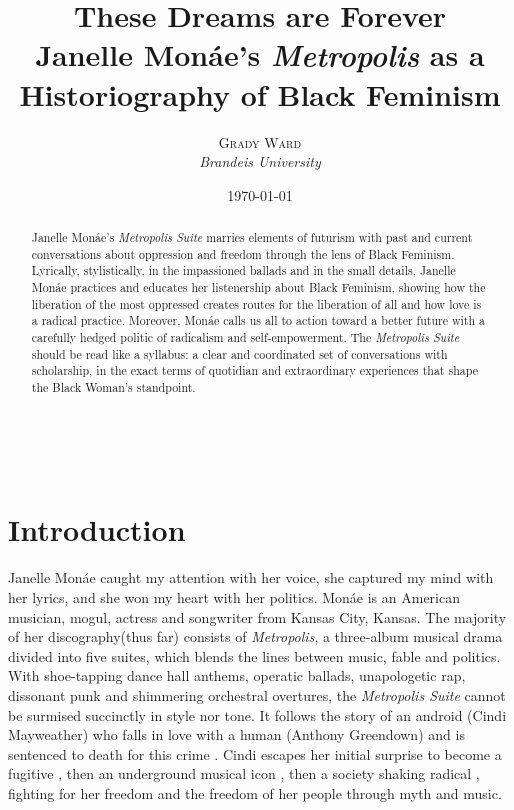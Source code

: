 \documentclass[a4paper, 11pt]{article} %
\title{\textbf{\linespread{2.1}These Dreams are Forever}\\ %
Janelle Mon\'ae's \emph{Metropolis} as a Historiography of Black Feminism} %
\author{\textsc{Grady Ward} %
\\{\textit{Brandeis University}}} %
\date{\today} %
\makeatletter
\renewcommand{\maketitle}{ %
\begin{flushright} %
	{\LARGE\@title} %

	\vspace{40pt} %

	{\large\@author} %
	\\\@date %

	\vspace{30pt} %
\end{flushright}
}
\makeatother
\begin{document}
\maketitle %


\begin{abstract}

Janelle Mon\'ae's \emph{Metropolis Suite} marries elements of futurism with past and current conversations about oppression and freedom through the lens of Black Feminism.
Lyrically, stylistically, in the impassioned ballads and in the small details, Janelle Mon\'ae practices and educates her listenership about Black Feminism, showing how the liberation of the most oppressed creates routes for the liberation of all and how love is a radical practice.
Moreover, Mon\'ae calls us all to action toward a better future with a carefully hedged politic of radicalism and self-empowerment.
The \emph{Metropolis Suite} should be read like a syllabus: a clear and coordinated set of conversations with scholarship, in the exact terms of quotidian and extraordinary experiences that shape the Black Woman's standpoint.
\end{abstract}

\vspace{30pt}


\section*{Introduction}

Janelle Mon\'ae caught my attention with her voice, she captured my mind with her lyrics, and she won my heart with her politics.
Mon\'ae is an American musician, mogul, actress and songwriter from Kansas City, Kansas.
The majority of her discography(thus far) consists of \emph{Metropolis}, a three-album musical drama divided into five suites, which blends the lines between music, fable and politics.
With shoe-tapping dance hall anthems, operatic ballads, unapologetic rap, dissonant punk and shimmering orchestral overtures, the \emph{Metropolis Suite} cannot be surmised succinctly in style nor tone.
It follows the story of an android (Cindi Mayweather) who falls in love with a human (Anthony Greendown) and is sentenced to death for this crime \cite{wolfmasters}.
Cindi escapes her initial surprise to become a fugitive \cite{manymoons}, then an underground musical icon \cite{favoritefugitive}, then a society shaking radical \cite{fiveseveneighttwoone}, fighting for her freedom and the freedom of her people through myth and music.
\end{document}
